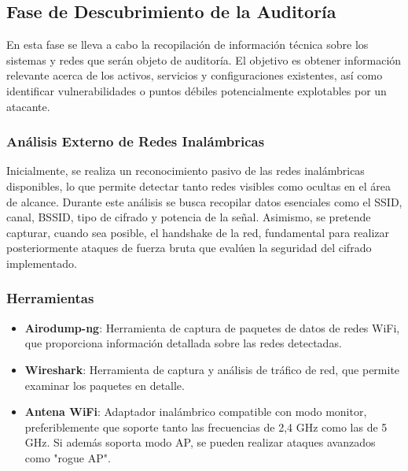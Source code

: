 \documentclass[a4paper, 11pt]{article}
\begin{document}
\subsection{Fase de Descubrimiento de la Auditoría}
\par\vspace{0.5cm}

En esta fase se lleva a cabo la recopilación de información técnica sobre los sistemas y redes que serán objeto de auditoría. El objetivo es obtener información relevante acerca de los activos, servicios y configuraciones existentes, así como identificar vulnerabilidades o puntos débiles potencialmente explotables por un atacante.


\subsubsection{Análisis Externo de Redes Inalámbricas}


\par\vspace{0.5cm}
Inicialmente, se realiza un reconocimiento pasivo de las redes inalámbricas disponibles, lo que permite detectar tanto redes visibles como ocultas en el área de alcance. Durante este análisis se busca recopilar datos esenciales como el SSID, canal, BSSID, tipo de cifrado y potencia de la señal. Asimismo, se pretende capturar, cuando sea posible, el handshake de la red, fundamental para realizar posteriormente ataques de fuerza bruta que evalúen la seguridad del cifrado implementado.

\par\vspace{0.5cm}
\subsubsection*{Herramientas}
\begin{itemize}
    \item \textbf{Airodump-ng}: Herramienta de captura de paquetes de datos de redes WiFi, que proporciona información detallada sobre las redes detectadas.
    \item  \textbf{Wireshark}: Herramienta de captura y análisis de tráfico de red, que permite examinar los paquetes en detalle.
    \item \textbf{Antena WiFi}: Adaptador inalámbrico compatible con modo monitor, preferiblemente que soporte tanto las frecuencias de 2,4 GHz como las de 5 GHz. Si además soporta modo AP, se pueden realizar ataques avanzados como "rogue AP".
\end{itemize}
\end{document}
